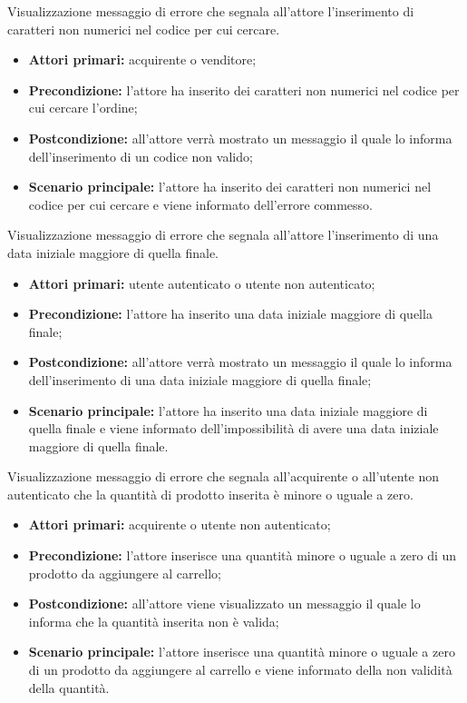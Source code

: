 \hypertarget{CodiceInvalido}{}
Visualizzazione messaggio di errore che segnala all'attore l'inserimento di caratteri non numerici nel codice per cui cercare.
\begin{itemize}
    \item \textbf{Attori primari:} acquirente o venditore;
    \item \textbf{Precondizione:} l'attore ha inserito dei caratteri non numerici nel codice per cui cercare l'ordine;
    \item \textbf{Postcondizione:} all'attore verrà mostrato un messaggio il quale lo informa dell'inserimento di un codice non valido;
    \item \textbf{Scenario principale:} l'attore ha inserito dei caratteri non numerici nel codice per cui cercare e viene informato dell'errore commesso.
\end{itemize}

\hypertarget{DateErrate}{}
Visualizzazione messaggio di errore che segnala all'attore l'inserimento di una data iniziale maggiore di quella finale.
\begin{itemize}
    \item \textbf{Attori primari:} utente autenticato o utente non autenticato;
    \item \textbf{Precondizione:} l'attore ha inserito una data iniziale maggiore di quella finale;
    \item \textbf{Postcondizione:} all'attore verrà mostrato un messaggio il quale lo informa dell'inserimento di una data iniziale maggiore di quella finale;
    \item \textbf{Scenario principale:} l'attore ha inserito una data iniziale maggiore di quella finale e viene informato dell'impossibilità di avere una data iniziale maggiore di quella finale.
\end{itemize}

\hypertarget{QuantitàAggiuntaInvalida}{}
Visualizzazione messaggio di errore che segnala all'acquirente o all'utente non autenticato che la quantità di prodotto inserita è minore o uguale a zero.
\begin{itemize}
    \item \textbf{Attori primari:} acquirente o utente non autenticato;
    \item \textbf{Precondizione:} l'attore inserisce una quantità minore o uguale a zero di un prodotto da aggiungere al carrello;
    \item \textbf{Postcondizione:} all'attore viene visualizzato un messaggio il quale lo informa che la quantità inserita non è valida;
    \item \textbf{Scenario principale:} l'attore inserisce una quantità minore o uguale a zero di un prodotto da aggiungere al carrello e viene informato della non validità della quantità.
\end{itemize}

